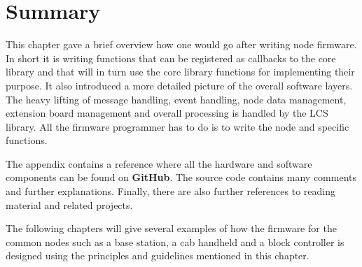 \section{Summary}

This chapter gave a brief overview how one would go after writing node firmware. In short it is writing functions that can be registered as callbacks to the core library and that will in turn use the core library functions for implementing their purpose. It also introduced a more detailed picture of the overall software layers. The heavy lifting of message handling, event handling, node data management, extension board management and overall processing is handled by the LCS library. All the firmware programmer has to do is to write the node and specific functions. 

The appendix contains a reference where all the hardware and software components can be found on \textbf{GitHub}. The source code contains many comments and further explanations. Finally, there are also further references to reading material and related projects.

The following chapters will give several examples of how the firmware for the common nodes such as a base station, a cab handheld and a block controller is designed using the principles and guidelines mentioned in this chapter.

